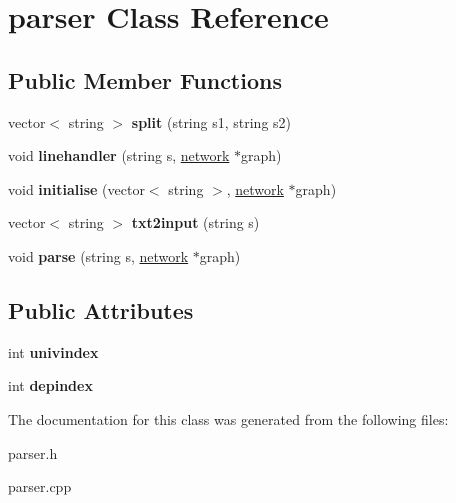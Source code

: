 \hypertarget{classparser}{\section{parser \-Class \-Reference}
\label{classparser}
}
\subsection*{\-Public \-Member \-Functions}
\begin{DoxyCompactItemize}
\item 
\hypertarget{classparser_a2a1fd363fc55b54383f6073126879ac1}{vector$<$ string $>$ {\bfseries split} (string s1, string s2)}\label{classparser_a2a1fd363fc55b54383f6073126879ac1}

\item 
\hypertarget{classparser_a1e346a39cc067f062760e492c61ec4fb}{void {\bfseries linehandler} (string s, \hyperlink{classnetwork}{network} $\ast$graph)}\label{classparser_a1e346a39cc067f062760e492c61ec4fb}

\item 
\hypertarget{classparser_a413427aa6330092b755173fed2cc23f5}{void {\bfseries initialise} (vector$<$ string $>$, \hyperlink{classnetwork}{network} $\ast$graph)}\label{classparser_a413427aa6330092b755173fed2cc23f5}

\item 
\hypertarget{classparser_ab845d2cf5728d91891dd77c0188802e8}{vector$<$ string $>$ {\bfseries txt2input} (string s)}\label{classparser_ab845d2cf5728d91891dd77c0188802e8}

\item 
\hypertarget{classparser_a762eda8d9913abc65748c14a3d4a932a}{void {\bfseries parse} (string s, \hyperlink{classnetwork}{network} $\ast$graph)}\label{classparser_a762eda8d9913abc65748c14a3d4a932a}

\end{DoxyCompactItemize}
\subsection*{\-Public \-Attributes}
\begin{DoxyCompactItemize}
\item 
\hypertarget{classparser_a1060be34bb34d89df79f03ce46c81a1a}{int {\bfseries univindex}}\label{classparser_a1060be34bb34d89df79f03ce46c81a1a}

\item 
\hypertarget{classparser_a5dcfb783329626a2b2d375b35d09a4b4}{int {\bfseries depindex}}\label{classparser_a5dcfb783329626a2b2d375b35d09a4b4}

\end{DoxyCompactItemize}


\-The documentation for this class was generated from the following files\-:\begin{DoxyCompactItemize}
\item 
parser.\-h\item 
parser.\-cpp\end{DoxyCompactItemize}
